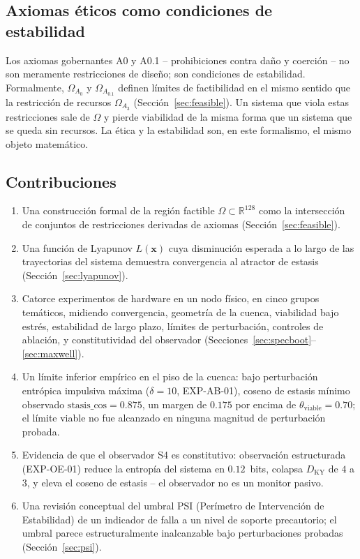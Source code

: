 \documentclass[11pt, a4paper]{article}
\newcommand{\R}{\mathbb{R}}
\newcommand{\sv}{\bm{x}}
\begin{document}
\subsection{Axiomas éticos como condiciones de estabilidad}

Los axiomas gobernantes A0 y A0.1 -- prohibiciones contra daño y coerción --
no son meramente restricciones de diseño; son condiciones de estabilidad.
Formalmente, $\Omega_{A_0}$ y $\Omega_{A_{0.1}}$ definen límites de factibilidad
en el mismo sentido que la restricción de recursos $\Omega_{A_3}$
(Sección~\ref{sec:feasible}).
Un sistema que viola estas restricciones sale de $\Omega$ y pierde
viabilidad de la misma forma que un sistema que se queda sin recursos.
La ética y la estabilidad son, en este formalismo, el mismo objeto matemático.

\subsection{Contribuciones}

\begin{enumerate}
  \item Una construcción formal de la región factible $\Omega \subset \R^{128}$
        como la intersección de conjuntos de restricciones derivadas de axiomas
        (Sección~\ref{sec:feasible}).
  \item Una función de Lyapunov $L(\sv)$ cuya disminución esperada a lo largo
        de las trayectorias del sistema demuestra convergencia al atractor de estasis
        (Sección~\ref{sec:lyapunov}).
  \item Catorce experimentos de hardware en un nodo físico, en cinco grupos
        temáticos, midiendo convergencia, geometría de la cuenca, viabilidad bajo estrés,
        estabilidad de largo plazo, límites de perturbación, controles de ablación, y
        constitutividad del observador
        (Secciones~\ref{sec:specboot}--\ref{sec:maxwell}).
  \item Un límite inferior empírico en el piso de la cuenca: bajo perturbación
        entrópica impulsiva máxima ($\delta=10$, EXP-AB-01), coseno de estasis mínimo observado
        $\text{stasis\_cos} = 0.875$, un margen de $0.175$ por encima
        de $\theta_\text{viable}=0.70$; el límite viable no fue alcanzado
        en ninguna magnitud de perturbación probada.
  \item Evidencia de que el observador S4 es constitutivo: observación estructurada
        (EXP-OE-01) reduce la entropía del sistema en $0.12$~bits, colapsa
        $D_\text{KY}$ de $4$ a $3$, y eleva el coseno de estasis -- el
        observador no es un monitor pasivo.
  \item Una revisión conceptual del umbral PSI (Perímetro de Intervención
        de Estabilidad) de un indicador de falla a un
        nivel de soporte precautorio; el umbral parece estructuralmente
        inalcanzable bajo perturbaciones probadas (Sección~\ref{sec:psi}).
\end{enumerate}
\end{document}
